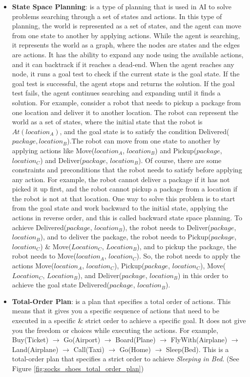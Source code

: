 \begin{itemize}
    \item \label{def:state_space_planning}
          \textbf{State Space Planning}: is a type of planning that is used in \ac{AI} to solve problems searching through a set of states and actions. In this type of planning, the world is represented as a set of states, and the agent can move from one state to another by applying actions. While the agent is searching, it represents the world as a graph, where the nodes are states and the edges are actions. It has the ability to expand any node using the available actions, and it can backtrack if it reaches a dead-end. When the agent reaches any node, it runs a goal test to check if the current state is the goal state. If the goal test is successful, the agent stops and returns the solution. If the goal test fails, the agent continues searching and expanding until it finds a solution. For example, consider a robot that needs to pickup a package from one location and deliver it to another location. The robot can represent the world as a set of states, where the initial state that the robot is $At(location_A)$, and the goal state is to satisfy the condition Delivered($package, location_B$).The robot can move from one state to another by applying actions like Move($location_A$, $location_B$) and Pickup($package$, $location_C$) and Deliver($package$, $location_B$). Of course, there are some constraints and preconditions that the robot needs to satisfy before applying any action. For example, the robot cannot deliver a package if it has not picked it up first, and the robot cannot pickup a package from a location if the robot is not at that location. One way to solve this problem is to start from the goal state and work backward to the initial state, applying the actions in reverse order, and this is called backward state space planning. To achieve Delivered($package$, $location_B$), the robot needs to Deliver($package$, $location_B$), and to deliver the package, the robot needs to Pickup($package$, $location_C$) \& Move($Location_C$, $Location_B$), and to pickup the package, the robot needs to Move($location_A$, $location_C$). So, the robot needs to apply the actions Move($location_A$, $location_C$), Pickup($package$, $location_C$), Move($Location_C$, $Location_B$), and Deliver($package$, $location_B$) in this order to achieve the goal state Delivered($package$, $location_B$).

    \item \label{def:total_order_plan}
          \textbf{Total-Order Plan}: is a plan that specifies a total order of actions. This means that it gives you a specific sequence of actions that need to be executed in a specific \& strict order to achieve a specific goal. It does not give you the freedom or choices while executing the actions. For example, Buy(Ticket) $\rightarrow$ Go(Airport) $\rightarrow$ Board(Plane) $\rightarrow$ FlyWith(Airplane) $\rightarrow$ Land(Airplane) $\rightarrow$ Call(Taxi) $\rightarrow$ Go(Home) $\rightarrow$ Sleep(Bed). This is a total-order plan that specifies a strict order to achieve \textit{Sleeping in Bed}. (See Figure \ref{fig:socks_shoes_total_order_plan})
          \begin{figure}[ht]
              \centering


\end{figure}
\end{itemize}
